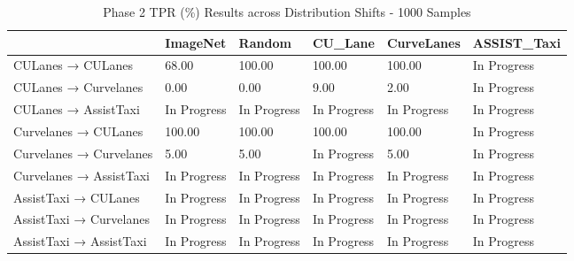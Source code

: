 \begin{table}
\caption{Phase 2 TPR (\%) Results across Distribution Shifts - 1000 Samples}
\label{tab:phase2_tpr_1000}
\begin{tabular}{llllll}
\toprule
 & ImageNet & Random & CU_Lane & CurveLanes & ASSIST_Taxi \\
\midrule
CULanes → CULanes & 68.00 & 100.00 & 100.00 & 100.00 & In Progress \\
CULanes → Curvelanes & 0.00 & 0.00 & 9.00 & 2.00 & In Progress \\
CULanes → AssistTaxi & In Progress & In Progress & In Progress & In Progress & In Progress \\
Curvelanes → CULanes & 100.00 & 100.00 & 100.00 & 100.00 & In Progress \\
Curvelanes → Curvelanes & 5.00 & 5.00 & In Progress & 5.00 & In Progress \\
Curvelanes → AssistTaxi & In Progress & In Progress & In Progress & In Progress & In Progress \\
AssistTaxi → CULanes & In Progress & In Progress & In Progress & In Progress & In Progress \\
AssistTaxi → Curvelanes & In Progress & In Progress & In Progress & In Progress & In Progress \\
AssistTaxi → AssistTaxi & In Progress & In Progress & In Progress & In Progress & In Progress \\
\bottomrule
\end{tabular}
\end{table}
